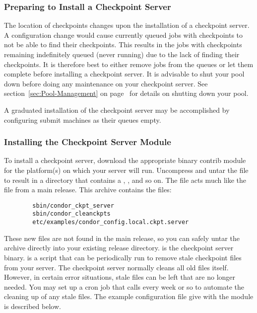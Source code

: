 \subsubsection{\label{Prepare-Ckpt-Server} Preparing to Install
a Checkpoint Server} 

The location of checkpoints changes upon the installation
of a checkpoint server.
A configuration change would cause 
currently queued jobs with checkpoints
to not be able to find their checkpoints.
This results in the jobs with checkpoints
remaining indefinitely queued (never running)
due to the lack of finding their checkpoints.
It is therefore best to 
either remove jobs from the queues or let them complete
before installing a checkpoint server.
It is advisable to shut your pool down before doing any
maintenance on your checkpoint server.  
See section~\ref{sec:Pool-Management} on
page~\pageref{sec:Pool-Management} for details on shutting
down your pool. 

A graduated installation of the checkpoint server may be
accomplished by 
configuring submit machines as their queues empty.

\subsubsection{\label{Install-Ckpt-Server-Module}
Installing the Checkpoint Server Module} 

To install a checkpoint server, download the appropriate binary
contrib module for the platform(s) on which your server will run.
Uncompress and untar the file to result in a directory that
contains a , , and so on.
The file  acts much like the  file
from a main release.
This archive contains the files:
\begin{verbatim}
        sbin/condor_ckpt_server
        sbin/condor_cleanckpts
        etc/examples/condor_config.local.ckpt.server
\end{verbatim}
These new files are not found in the main release, so you can
safely untar the archive directly into your existing release
directory. 
 is the checkpoint server binary.
 is a script that can be periodically run to
remove stale checkpoint files from your server.  
The checkpoint server normally cleans all old files itself.  
However, in certain error situations, stale files can be left that are
no longer needed.
You may set up a cron job that calls
 every week or so to automate the cleaning up
of any
stale files.
The example configuration file give with the module
is described below.

